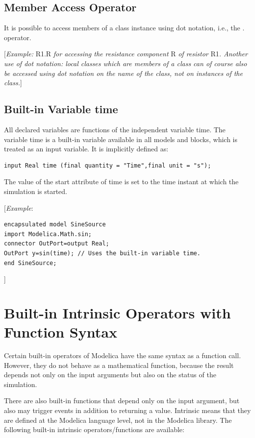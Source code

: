 \documentclass[10pt,a4paper]{report}
\def\doublelabel#1{\label{#1}\hypertarget{#1}{}}
\begin{document}
\subsection{Member Access Operator}\doublelabel{member-access-operator}

It is possible to access members of a class instance using dot notation,
i.e., the . operator.

{[}\emph{Example:} R1.R \emph{for accessing the resistance component} R
\emph{of resistor} R1\emph{. Another use of dot notation: local classes
which are members of a class can of course also be accessed using dot
notation on the name of the class, not on instances of the class.}{]}

\subsection{Built-in Variable time}\doublelabel{built-in-variable-time}

All declared variables are functions of the independent variable time.
The variable time is a built-in variable available in all models and
blocks, which is treated as an input variable. It is implicitly defined
as:
\begin{lstlisting}[language=modelica]
input Real time (final quantity = "Time",final unit = "s");
\end{lstlisting}

The value of the start attribute of time is set to the time instant at
which the simulation is started.

{[}\emph{Example}:
\begin{lstlisting}[language=modelica]
encapsulated model SineSource
import Modelica.Math.sin;
connector OutPort=output Real;
OutPort y=sin(time); // Uses the built-in variable time.
end SineSource;
\end{lstlisting}
{]}

\section{Built-in Intrinsic Operators with Function Syntax}\doublelabel{built-in-intrinsic-operators-with-function-syntax}

Certain built-in operators of Modelica have the same syntax as a
function call. However, they do not behave as a mathematical function,
because the result depends not only on the input arguments but also on
the status of the simulation.

There are also built-in functions that depend only on the input
argument, but also may trigger events in addition to returning a value.
Intrinsic means that they are defined at the Modelica language level,
not in the Modelica library. The following built-in intrinsic
operators/functions are available:
\end{document}
